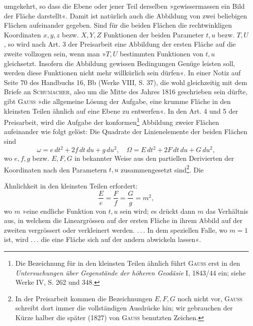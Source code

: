 umgekehrt, so dass die Ebene oder jener Teil derselben »gewissermassen ein
Bild der Fläche darstellt«. Damit ist natürlich auch die Abbildung von zwei
beliebigen Flächen aufeinander gegeben. Sind für die beiden Flächen die
rechtwinkligen Koordinaten \(x,y,z\) bezw. \(X,Y,Z\) Funktionen der beiden Parameter
\(t,u\) bezw. \(T,U\), so wird nach Art. 3 der Preisarbeit eine Abbildung
der ersten Fläche auf die zweite vollzogen sein, wenn man »\(T,U\) bestimmten
Funktionen von \(t,u\) gleichsetzt. Insofern die Abbildung gewissen Bedingungen
Genüge leisten soll, werden diese Funktionen nicht mehr willkürlich sein
dürfen«. In einer Notiz auf Seite 70 des Handbuchs 16, Bb (Werke VIII,
S. 37), die wohl gleichzeitig mit dem Briefe an \textsc{Schumacher}, also um die
Mitte des Jahres 1816 geschrieben sein dürfte, gibt \textsc{Gauss} »die allgemeine
Lösung der Aufgabe, eine krumme Fläche in den kleinsten Teilen ähnlich
auf eine Ebene zu entwerfen«. In den Art. 4 und 5 der Preisarbeit, wird
die Aufgabe der konformen\footnote{Die Bezeichnung  für in den kleinsten Teilen ähnlich führt \textsc{Gauss} erst in den \textit{Untersuchungen über Gegenstände der höheren Geodäsie} I, 1843/44 ein; siehe Werke IV, S. 262 und 348.} Abbildung zweier Flächen aufeinander wie folgt
gelöst: Die Quadrate der Linienelemente der beiden Flächen sind
\[
\omega=e\,dt^2+2f\,dt\,du+g\,du^2,\quad \Omega=E\,dt^2+2F\,dt\,du+G\,du^2,
\]
wo \(e,f,g\) bezw. \(E,F,G\) in bekannter Weise aus den partiellen Derivierten
der Koordinaten nach den Parametern \(t,u\) zusammengesetzt sind\footnote{In der Preisarbeit kommen die Bezeichnungen \(E,F,G\) noch nicht vor, \textsc{Gauss} schreibt dort immer die vollständigen Ausdrücke hin; wir gebrauchen der Kürze halber die später (1827) von \textsc{Gauss} benutzten Zeichen.}. Die
\par\clearpage{}
\noindent Ähnlichkeit in den kleinsten Teilen erfordert:
\begingroup\makeatletter\tagsleft@true\let\veqno\leqno\makeatother
\begin{equation*}
\frac Ee=\frac Ff=\frac Gg=m^2,\tag{10}
\end{equation*}
\endgroup
\noindent wo \(m\) »eine endliche Funktion von \(t,u\) sein wird; es drückt dann \(m\) das Verhältnis
aus, in welchem die Lineargrössen auf der ersten Fläche in ihrem
Abbild auf der zweiten vergrössert oder verkleinert werden. \mbox{.\,.\,.} In dem speziellen
Falle, wo \(m=1\) ist, wird \mbox{.\,.\,.} die eine Fläche sich auf der andern
abwickeln lassen«.

